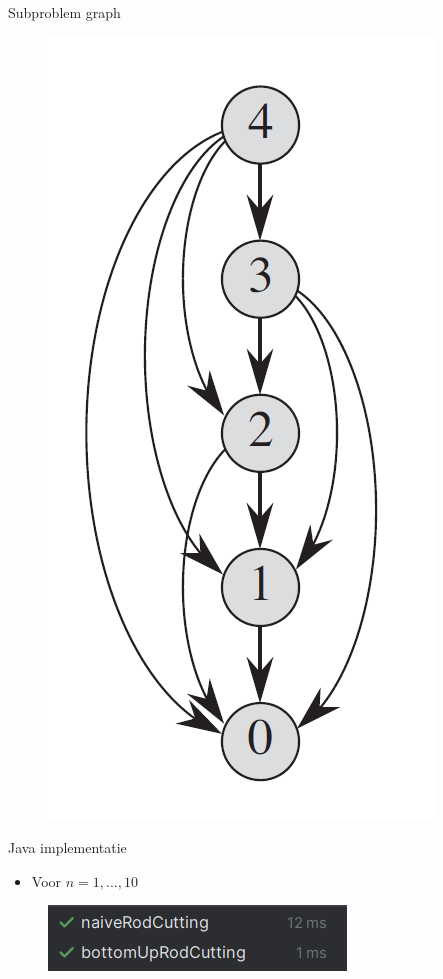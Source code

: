 \documentclass
   [kulak] %
   {kulakbeamer}
\begin{document}
\begin{frame}{Subproblem graph}
    \begin{figure}
        \centering
        \includegraphics[width=0.2\linewidth]{subproblem-graph.png}
    \end{figure}
\end{frame}

\begin{frame}{Java implementatie}
\begin{itemize}
    \item Voor $n = 1,...,10$
\end{itemize}
\begin{figure}
    \centering
    \includegraphics[width=0.9\linewidth]{java.png}
\end{figure}
\end{frame}
\end{document}
